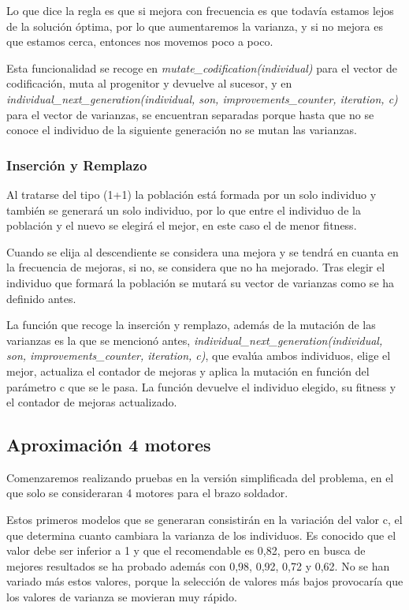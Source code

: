 \documentclass[12pt, spanish, pdftex]{UC3M_document}
\begin{document}
Lo que dice la regla es que si mejora con frecuencia es que todavía estamos lejos de la solución óptima, por lo que aumentaremos la varianza, y si no mejora es que estamos cerca, entonces nos movemos poco a poco.

Esta funcionalidad se recoge en \textit{mutate\_codification(individual)} para el vector de codificación, muta al progenitor y devuelve al sucesor, y en \textit{individual\_next\_generation(individual, son, improvements\_counter, iteration, c)} para el vector de varianzas, se encuentran separadas porque hasta que no se conoce el individuo de la siguiente generación no se mutan las varianzas.

\subsubsection{Inserción y Remplazo}
Al tratarse del tipo (1+1) la población está formada por un solo individuo y también se generará un solo individuo, por lo que entre el individuo de la población y el nuevo se elegirá el mejor, en este caso el de menor fitness.

Cuando se elija al descendiente se considera una mejora y se tendrá en cuanta en la frecuencia de mejoras, si no, se considera que no ha mejorado. Tras elegir el individuo que formará la población se mutará su vector de varianzas como se ha definido antes.

La función que recoge la inserción y remplazo, además de la mutación de las varianzas es la que se mencionó antes, \textit{individual\_next\_generation(individual, son, improvements\_counter, iteration, c)}, que evalúa ambos individuos, elige el mejor, actualiza el contador de mejoras y aplica la mutación en función del parámetro c que se le pasa. La función devuelve el individuo elegido, su fitness y el contador de mejoras actualizado. 

\subsection{Aproximación 4 motores}\label{sec:4m}
Comenzaremos realizando pruebas en la versión simplificada del problema, en el que solo se consideraran 4 motores para el brazo soldador. 

Estos primeros modelos que se generaran consistirán en la variación del valor c, el que determina cuanto cambiara la varianza de los individuos. Es conocido que el valor debe ser inferior a 1 y que el recomendable es 0,82, pero en busca de mejores resultados se ha probado además con 0,98, 0,92, 0,72 y 0,62. No se han variado más estos valores, porque la selección de valores más bajos provocaría que los valores de varianza se movieran muy rápido.
\end{document}
